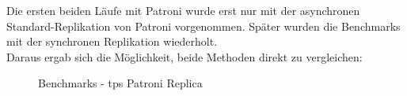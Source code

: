 \begin{flushleft}
    Die ersten beiden Läufe mit Patroni wurde erst nur mit der asynchronen Standard-Replikation von Patroni vorgenommen.
    Später wurden die Benchmarks mit der synchronen Replikation wiederholt.\\
    Daraus ergab sich die Möglichkeit, beide Methoden direkt zu vergleichen:
    \begin{figure}[H]
        \centering
        \qquad
        \caption{Benchmarks - tps Patroni Replica}
        \label{fig:tps_patroni_replica}
    \end{figure}
    \begin{figure}[H]
        \centering

\end{figure}
\end{flushleft}
